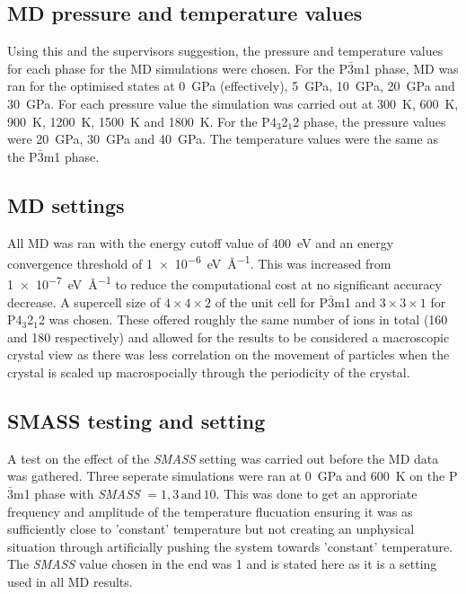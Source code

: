 \documentclass[a4paper,12pt]{article}
\begin{document}
\subsection{MD pressure and temperature values}
Using this and the supervisors suggestion, the pressure and temperature values for each phase for the MD simulations were chosen. For the P$\bar{3}$m1 phase, MD was ran for the optimised states at \SI{0}{\GPa} (effectively), \SI{5}{\GPa}, \SI{10}{\GPa}, \SI{20}{\GPa} and \SI{30}{\GPa}. For each pressure value the simulation was carried out at \SI{300}{\K}, \SI{600}{\K}, \SI{900}{\K}, \SI{1200}{\K}, \SI{1500}{\K} and \SI{1800}{\K}. For the P4$_3$2$_1$2 phase, the pressure values were \SI{20}{\GPa}, \SI{30}{\GPa} and \SI{40}{\GPa}. The temperature values were the same as the P$\bar{3}$m1 phase. 

\subsection{MD settings}
All MD was ran with the energy cutoff value of \SI{400}{\eV} and an energy convergence threshold of \SI{1e-6}{\eV \AA ^{-1}}. This was increased from \SI{1e-7}{\eV \AA ^{-1}} to reduce the computational cost at no significant accuracy decrease. A supercell size of $4\times 4 \times 2$ of the unit cell for P$\bar{3}$m1 and $3 \times 3 \times 1$ for P4$_3$2$_1$2 was chosen. These offered roughly the same number of ions in total (160 and 180 respectively) and allowed for the results to be considered a macroscopic crystal view as there was less correlation on the movement of particles when the crystal is scaled up macrospocially through the periodicity of the crystal.

\subsection{SMASS testing and setting}
A test on the effect of the \textit{SMASS} setting was carried out before the MD data was gathered. Three seperate simulations were ran at \SI{0}{\GPa} and \SI{600}{\K} on the P$\bar{3}$m1 phase with \textit{SMASS} $=1, 3 \, \mathrm{and} \, 10$. This was done to get an approriate frequency and amplitude of the temperature flucuation ensuring it was as sufficiently close to 'constant' temperature but not creating an unphysical situation through artificially pushing the system towards 'constant' temperature. The \textit{SMASS} value chosen in the end was 1 and is stated here as it is a setting used in all MD results.
\end{document}
